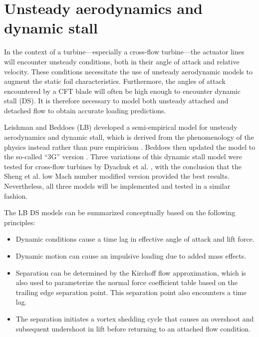 

\section{Unsteady aerodynamics and dynamic stall}

In the context of a turbine---especially a cross-flow turbine---the actuator
lines will encounter unsteady conditions, both in their angle of attack and
relative velocity. These conditions necessitate the use of unsteady aerodynamic
models to augment the static foil characteristics. Furthermore, the angles of
attack encountered by a CFT blade will often be high enough to encounter dynamic
stall (DS). It is therefore necessary to model both unsteady attached and
detached flow to obtain accurate loading predictions.


Leishman and Beddoes (LB) developed a semi-empirical model for unsteady
aerodynamics and dynamic stall, which is derived from the phenomenology of the
physics instead rather than pure empiricism \cite{Leishman1989}. Beddoes then
updated the model to the so-called ``3G'' version \cite{Beddoes1993}. Three
variations of this dynamic stall model were tested for cross-flow turbines by
Dyachuk et al. \cite{Dyachuk2014}, with the conclusion that the Sheng et al. low
Mach number modified version \cite{Sheng2008} provided the best results.
Nevertheless, all three models will be implemented and tested in a similar
fashion.

The LB DS models can be summarized conceptually based on the following principles:
\begin{itemize}
    \item Dynamic conditions cause a time lag in effective angle of attack and
    lift force.
    
    \item Dynamic motion can cause an impulsive loading due to added mass
    effects.
    
    \item Separation can be determined by the Kirchoff flow approximation, which
    is also used to parameterize the normal force coefficient table based on the
    trailing edge separation point. This separation point also encounters a time
    lag.
    
    \item The separation initiates a vortex shedding cycle that causes an
    overshoot and subsequent undershoot in lift before returning to an attached
    flow condition.
\end{itemize}


